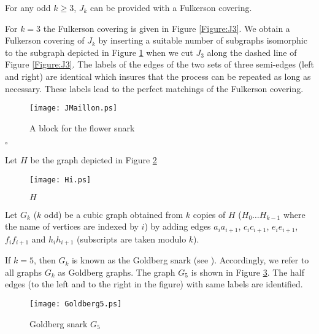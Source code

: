 \documentclass{amsart}
\theoremstyle{definition}
\theoremstyle{remark}
\newenvironment{prf}{{\bf \noindent Proof } }{\hfill$\square$\\}
\begin{document}
\begin{thm}  \label{Theorem:FlowerSnark} For any odd $k\geq 3$, $J_{k}$ can be
provided with a Fulkerson covering.
\end{thm}
\begin{prf}
For $k=3$ the Fulkerson covering is given in Figure \ref{Figure:J3}.
We obtain a Fulkerson covering of $J_{k}$ by inserting a suitable
number of subgraphs isomorphic to the subgraph depicted in Figure
\ref{Figure:JMaillon} when we cut $J_{3}$ along the dashed line of
Figure \ref{Figure:J3}. The labels of the edges of the two sets of
three semi-edges (left and right) are identical which insures that
the process can be repeated as long as necessary. These labels lead
to the perfect matchings of the Fulkerson covering.

\begin{figure}
\texttt{[image: JMaillon.ps]}
\caption{A block for the flower snark} \label{Figure:JMaillon}
\end{figure}
\end{prf}


Let $H$ be the graph depicted in Figure \ref{Figure:Hi}

\begin{figure}
\texttt{[image: Hi.ps]}
\caption{$H$} \label{Figure:Hi}
\end{figure}


Let $G_{k}$ ($k$ odd) be a cubic graph obtained from $k$ copies of
$H$ ($H_{0} \ldots H_{k-1}$ where the name of vertices are indexed
by $i$) by adding edges  $a_{i}a_{i+1}$, $c_{i}c_{i+1}$,
$e_{i}e_{i+1}$, $f_{i}f_{i+1}$ and $h_{i}h_{i+1}$ (subscripts are
taken modulo $k$).

If $k = 5$, then $G_k$ is known as the Goldberg snark (see
\cite{Gol81}). Accordingly, we refer to all graphs $G_k$ as Goldberg
graphs. The graph $G_5$ is shown in Figure \ref{Figure:Goldberg5}.
The half edges (to the left and to the right in the figure) with
same labels are identified.


\begin{figure}
\centering 
\texttt{[image: Goldberg5.ps]}
\caption{Goldberg snark $G_5$} \label{Figure:Goldberg5}
\end{figure}
\end{document}
